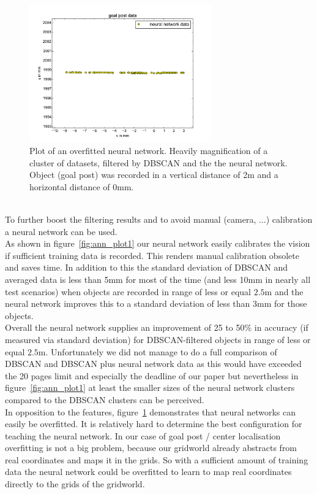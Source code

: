 \documentclass[lnicst,a4paper]{svmultln}
\begin{document}
\begin{figure}
 	\centerline{\includegraphics[width=0.7\textwidth]{ann_plot2.pdf}}
	{\caption{Plot of an overfitted neural network. Heavily magnification of a cluster of datasets, filtered by DBSCAN and the the neural network. Object (goal post) was recorded in a vertical distance of 2m and a horizontal distance of 0mm. }\label{fig:ann_plot2}}
\end{figure}
\\
To further boost the filtering results and to avoid manual (camera, ...) calibration a neural network can be used.
\\
As shown in figure~\ref{fig:ann_plot1} our neural network easily calibrates the vision if sufficient training data is recorded. This renders manual calibration obsolete and saves time. In addition to this the standard deviation of DBSCAN and averaged data is less than 5mm for most of the time (and less 10mm in nearly all test scenarios) when objects are recorded in range of less or equal $2.5$m and the neural network improves this to a standard deviation of less than 3mm for those objects.
\\
Overall the neural network supplies an improvement of 25 to 50\% in accuracy (if measured via standard deviation) for DBSCAN-filtered objects in range of less or equal $2.5$m. Unfortunately we did not manage to do a full comparison of DBSCAN and DBSCAN plus neural network data as this would have exceeded the 20 pages limit and especially the deadline of our paper but nevertheless in figure~\ref{fig:ann_plot1} at least the smaller sizes of the neural network clusters compared to the DBSCAN clusters can be perceived.
\\
In opposition to the features, figure~\ref{fig:ann_plot2} demonstrates that neural networks can easily be overfitted. It is relatively hard to determine the best configuration for teaching the neural network. In our case of goal post / center localisation overfitting is not a big problem, because our gridworld already abstracts from real coordinates and maps it in the grids. So with a sufficient amount of training data the neural network could be overfitted to learn to map real coordinates directly to the grids of the gridworld.
\end{document}
